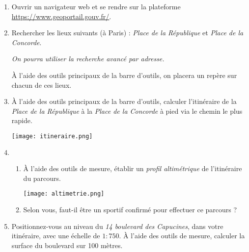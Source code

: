 \documentclass[a4paper]{article}
\begin{document}
      \begin{enumerate}
	\item Ouvrir un navigateur web et se rendre sur la plateforme \href{https://www.geoportail.gouv.fr/}{https://www.geoportail.gouv.fr/}. 
	\item Rechercher les lieux suivants (à Paris) : \textit{Place de la République} et \textit{Place de la Concorde}. 

	  \textit{On pourra utiliser la recherche avancé par adresse.}

	  À l'aide des outils principaux de la barre d'outils, on placera un repère sur chacun de ces lieux. 
	\item À l'aide des outils principaux de la barre d'outils, calculer l'itinéraire de la \textit{Place de la République} à la \textit{Place de la Concorde} à pied via le chemin le plus rapide.

	  \begin{center}
	    \texttt{[image: itineraire.png]}
	  \end{center}


	  \medskip 

	  \dotfill{}



	\item 

	  \begin{enumerate}
	    \pagebreak
	    \item À l'aide des outils de mesure, établir un \textit{profil altimétrique} de l'itinéraire du parcours. 

	      {\color{blue}
		\begin{center}
		  \texttt{[image: altimetrie.png]}
		\end{center}
	      }
	    \item Selon vous, faut-il être un sportif confirmé pour effectuer ce parcours ? 


	      \medskip 

	      \dotfill 


	  \end{enumerate}

	\item Positionnez-vous au niveau du \textit{14 boulevard des Capucines}, dans votre itinéraire, avec une échelle de $1:750$.
	  À l'aide des outils de mesure, calculer la surface du boulevard sur 100 mètres.


\end{enumerate}
\end{document}
